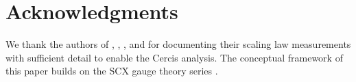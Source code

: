 \documentclass[12pt,a4paper]{article}
\theoremstyle{remark}
\begin{document}
\section*{Acknowledgments}
We thank the authors of \cite{kaplan2020scaling}, \cite{hoffmann2022training}, \cite{besiroglu2024chinchilla}, and \cite{porian2024resolving} for documenting their scaling law measurements with sufficient detail to enable the Cercis analysis. The conceptual framework of this paper builds on the SCX gauge theory series \cite{scx_gauge_formalized, scx_gauge_physics, scx_fiber_bundle}.

\end{document}
